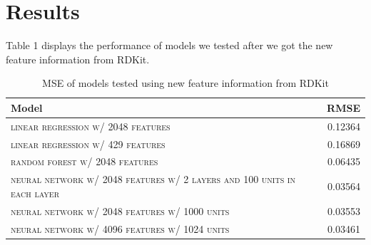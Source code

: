 \documentclass[11pt]{article}
\begin{document}
\section{Results}
Table 1 displays the performance of models we tested after we got the new feature information from RDKit. 

\begin{table}[h]
\centering
\begin{tabular}{llr}
 \toprule
 Model &  & RMSE \\
 \midrule
 \textsc{linear regression w/ 2048 features} & & 0.12364\\
 \textsc{linear regression w/ 429 features} & & 0.16869 \\
 \textsc{random forest w/ 2048 features} & & 0.06435 \\
 \textsc{neural network w/ 2048 features w/ 2 layers and 100 units in each layer} & & 0.03564  \\
 \textsc{neural network w/ 2048 features w/ 1000 units} & &0.03553 \\
 \textsc{neural network w/ 4096 features w/ 1024 units} & & 0.03461\\
 \bottomrule
\end{tabular}
\caption{\label{tab:results} MSE of models tested using new feature information from RDKit}
\end{table}
\end{document}
